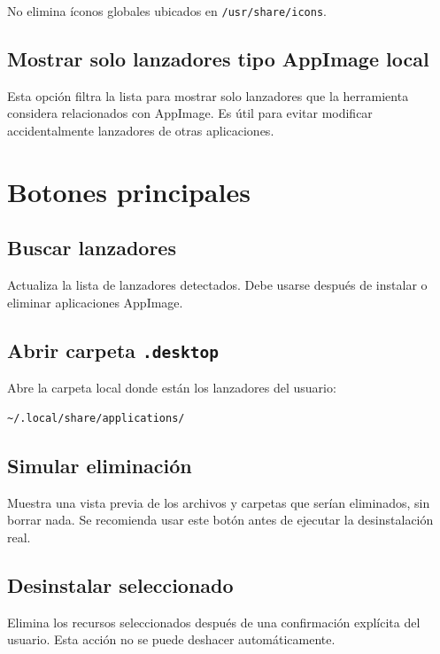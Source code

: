 \documentclass[11pt,a4paper]{article}
\begin{document}
No elimina íconos globales ubicados en \texttt{/usr/share/icons}.

\subsection{Mostrar solo lanzadores tipo AppImage local}

Esta opción filtra la lista para mostrar solo lanzadores que la herramienta considera relacionados con AppImage. Es útil para evitar modificar accidentalmente lanzadores de otras aplicaciones.

\section{Botones principales}

\subsection{Buscar lanzadores}

Actualiza la lista de lanzadores detectados. Debe usarse después de instalar o eliminar aplicaciones AppImage.

\subsection{Abrir carpeta \texttt{.desktop}}

Abre la carpeta local donde están los lanzadores del usuario:

\begin{lstlisting}[style=textstyle]
~/.local/share/applications/
\end{lstlisting}

\subsection{Simular eliminación}

Muestra una vista previa de los archivos y carpetas que serían eliminados, sin borrar nada. Se recomienda usar este botón antes de ejecutar la desinstalación real.

\subsection{Desinstalar seleccionado}

Elimina los recursos seleccionados después de una confirmación explícita del usuario. Esta acción no se puede deshacer automáticamente.
\end{document}
